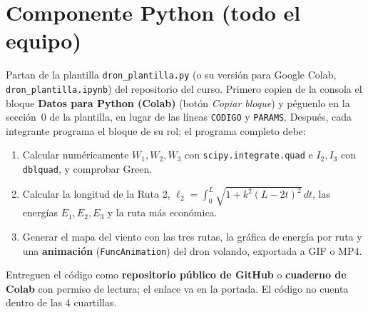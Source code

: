 \documentclass[11pt,letterpaper]{article}
\begin{document}
\section{Componente Python (todo el equipo)}
Partan de la plantilla \texttt{dron\_plantilla.py} (o su versión para Google Colab, \texttt{dron\_plantilla.ipynb}) del repositorio del curso. Primero copien de la consola el bloque \textbf{Datos para Python (Colab)} (botón \emph{Copiar bloque}) y péguenlo en la sección~0 de la plantilla, en lugar de las líneas \texttt{CODIGO} y \texttt{PARAMS}. Después, cada integrante programa el bloque de su rol; el programa completo debe:
\begin{enumerate}
\item Calcular numéricamente \(W_1,W_2,W_3\) con \texttt{scipy.integrate.quad} e \(I_2,I_3\) con \texttt{dblquad}, y comprobar Green.
\item Calcular la longitud de la Ruta 2, \(\ell_2=\int_0^L\sqrt{1+k^2(L-2t)^2}\,dt\), las energías \(E_1,E_2,E_3\) y la ruta más económica.
\item Generar el mapa del viento con las tres rutas, la gráfica de energía por ruta y una \textbf{animación} (\texttt{FuncAnimation}) del dron volando, exportada a GIF o MP4.
\end{enumerate}
Entreguen el código como \textbf{repositorio público de GitHub} o \textbf{cuaderno de Colab} con permiso de lectura; el enlace va en la portada. El código no cuenta dentro de las 4 cuartillas.
\end{document}
